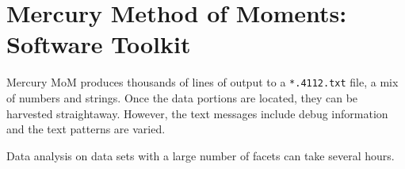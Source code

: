 % 

\section{Mercury Method of Moments: Software Toolkit}

Mercury MoM produces thousands of lines of output to a \texttt{*.4112.txt} file, a mix of numbers and strings. Once the data portions are located, they can be harvested straightaway. However, the text messages include debug information and the text patterns are varied.

Data analysis on data sets with a large number of facets can take several hours.

		

\endinput  %
